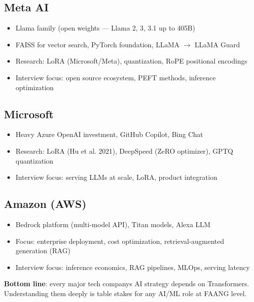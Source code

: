 \documentclass[11pt]{article}
\providecommand{\tightlist}{\setlength{\itemsep}{1pt}\setlength{\parskip}{0pt}}
\begin{document}
\subsection{Meta AI}\label{meta-ai}

\begin{itemize}
\tightlist
\item
  Llama family (open weights --- Llama 2, 3, 3.1 up to 405B)
\item
  FAISS for vector search, PyTorch foundation, LLaMA \(\rightarrow\) LLaMA Guard
\item
  Research: LoRA (Microsoft/Meta), quantization, RoPE positional encodings
\item
  Interview focus: open source ecosystem, PEFT methods, inference optimization
\end{itemize}

\subsection{Microsoft}\label{microsoft}

\begin{itemize}
\tightlist
\item
  Heavy Azure OpenAI investment, GitHub Copilot, Bing Chat
\item
  Research: LoRA (Hu et al. 2021), DeepSpeed (ZeRO optimizer), GPTQ quantization
\item
  Interview focus: serving LLMs at scale, LoRA, product integration
\end{itemize}

\subsection{Amazon (AWS)}\label{amazon-aws}

\begin{itemize}
\tightlist
\item
  Bedrock platform (multi-model API), Titan models, Alexa LLM
\item
  Focus: enterprise deployment, cost optimization, retrieval-augmented generation (RAG)
\item
  Interview focus: inference economics, RAG pipelines, MLOps, serving latency
\end{itemize}

\textbf{Bottom line}: every major tech company\textquotesingle s AI strategy depends on Transformers. Understanding them deeply is table stakes for any AI/ML role at FAANG level.
\end{document}

